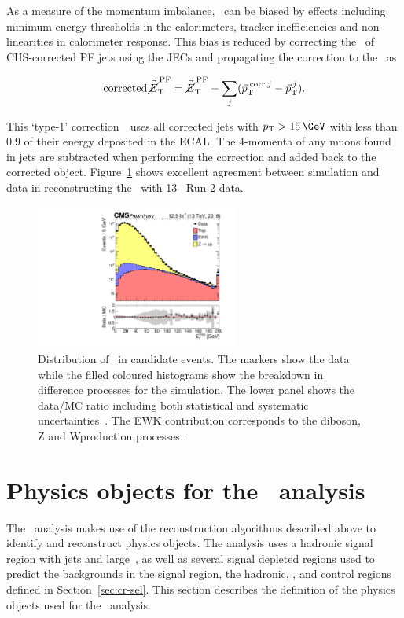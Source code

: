 As a measure of the momentum imbalance, \metvec~can be biased by effects including 
minimum energy thresholds in the calorimeters, tracker inefficiencies and non-linearities
in calorimeter response. This bias is reduced by correcting the \pt~of CHS-corrected PF jets 
using the JECs and propagating the correction to the \metvec~as

\begin{equation}
\text{corrected}\,\mbox{$\vec{\cancel{E}}^{\,\text{PF}}_{\rm T}$} = \mbox{$\vec{\cancel{E}}^{\,\text{PF}}_{\rm T}$} - \sum_{j}(\vec{p}^{\;\text{corr},j}_\text{T} -
\vec{p}_\text{T}^{\,j}).
\end{equation}

This `type-1' correction~\cite{met_fig}~uses all corrected jets with $\pt > 15\,\GeV$ with less than 0.9 of their energy deposited in the ECAL.
The 4-momenta of any muons found in jets are subtracted when performing the correction and added back to the corrected object.
Figure~\ref{fig:met_fig} shows excellent agreement between simulation and data
in reconstructing the \met~with 13 \TeV~Run 2 data.

\begin{figure}
\centering
    \includegraphics[width=0.6\textwidth]{./Figures/reconstruction/met_fig.pdf}
  \caption{Distribution of \met~in \zmumu candidate events. The markers show the data while the filled coloured histograms
  show the breakdown in difference processes for the simulation. The lower panel shows the data/MC ratio including
  both statistical and systematic uncertainties~\cite{met_fig}. The EWK contribution corresponds to the diboson, Z\gamma 
  and W\gamma production processes
  \label{fig:met_fig}.
}
\end{figure}

\section{Physics objects for the \alphat~analysis}

The \alphat~analysis makes use of the reconstruction algorithms described above
to identify and reconstruct physics objects. The analysis uses a hadronic signal 
region with jets and large~\met, as well as several signal depleted regions used to predict the
backgrounds in the signal region, the hadronic, \gj, \mj and \mmj control regions defined in 
Section~\ref{sec:cr-sel}. This section describes the definition of the 
physics objects used for the \alphat~analysis.

